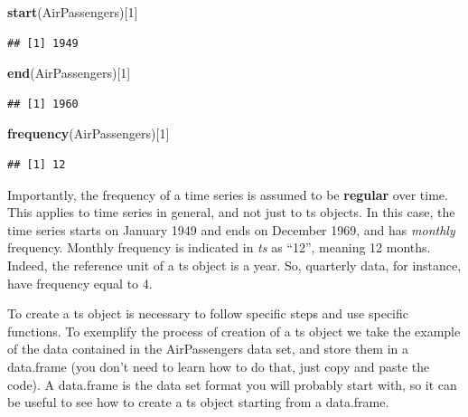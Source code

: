 \documentclass[
]{article}
\newenvironment{Shaded}{\begin{snugshade}}{\end{snugshade}}
\newcommand{\DecValTok}[1]{\textcolor[rgb]{0.00,0.00,0.81}{#1}}
\newcommand{\KeywordTok}[1]{\textcolor[rgb]{0.13,0.29,0.53}{\textbf{#1}}}
\newcommand{\NormalTok}[1]{#1}
\begin{document}
\begin{Shaded}
\begin{Highlighting}[]
\KeywordTok{start}\NormalTok{(AirPassengers)[}\DecValTok{1}\NormalTok{]}
\end{Highlighting}
\end{Shaded}

\begin{verbatim}
## [1] 1949
\end{verbatim}

\begin{Shaded}
\begin{Highlighting}[]
\KeywordTok{end}\NormalTok{(AirPassengers)[}\DecValTok{1}\NormalTok{]}
\end{Highlighting}
\end{Shaded}

\begin{verbatim}
## [1] 1960
\end{verbatim}

\begin{Shaded}
\begin{Highlighting}[]
\KeywordTok{frequency}\NormalTok{(AirPassengers)[}\DecValTok{1}\NormalTok{]}
\end{Highlighting}
\end{Shaded}

\begin{verbatim}
## [1] 12
\end{verbatim}

Importantly, the frequency of a time series is assumed to be \textbf{regular} over time. This applies to time series in general, and not just to ts objects. In this case, the time series starts on January 1949 and ends on December 1969, and has \emph{monthly} frequency. Monthly frequency is indicated in \emph{ts} as ``12'', meaning 12 months. Indeed, the reference unit of a ts object is a year. So, quarterly data, for instance, have frequency equal to 4.

To create a ts object is necessary to follow specific steps and use specific functions. To exemplify the process of creation of a ts object we take the example of the data contained in the AirPassengers data set, and store them in a data.frame (you don't need to learn how to do that, just copy and paste the code). A data.frame is the data set format you will probably start with, so it can be useful to see how to create a ts object starting from a data.frame.
\end{document}
